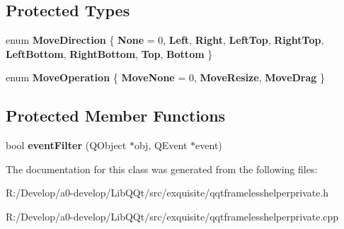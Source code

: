 \subsection*{Protected Types}
\begin{DoxyCompactItemize}
\item 
\mbox{\label{class_q_qt_frameless_helper_private_a7449c8b09aa80adac7609c7772852992}} 
enum {\bfseries Move\+Direction} \{ \newline
{\bfseries None} = 0, 
{\bfseries Left}, 
{\bfseries Right}, 
{\bfseries Left\+Top}, 
\newline
{\bfseries Right\+Top}, 
{\bfseries Left\+Bottom}, 
{\bfseries Right\+Bottom}, 
{\bfseries Top}, 
\newline
{\bfseries Bottom}
 \}
\item 
\mbox{\label{class_q_qt_frameless_helper_private_a8dad7790fde2ba812b04cc8d25a5164a}} 
enum {\bfseries Move\+Operation} \{ {\bfseries Move\+None} = 0, 
{\bfseries Move\+Resize}, 
{\bfseries Move\+Drag}
 \}
\end{DoxyCompactItemize}
\subsection*{Protected Member Functions}
\begin{DoxyCompactItemize}
\item 
\mbox{\label{class_q_qt_frameless_helper_private_a936e92950a128a999ddf2c20ab4e051b}} 
bool {\bfseries event\+Filter} (Q\+Object $\ast$obj, Q\+Event $\ast$event)
\end{DoxyCompactItemize}


The documentation for this class was generated from the following files\+:\begin{DoxyCompactItemize}
\item 
R\+:/\+Develop/a0-\/develop/\+Lib\+Q\+Qt/src/exquisite/qqtframelesshelperprivate.\+h\item 
R\+:/\+Develop/a0-\/develop/\+Lib\+Q\+Qt/src/exquisite/qqtframelesshelperprivate.\+cpp\end{DoxyCompactItemize}
